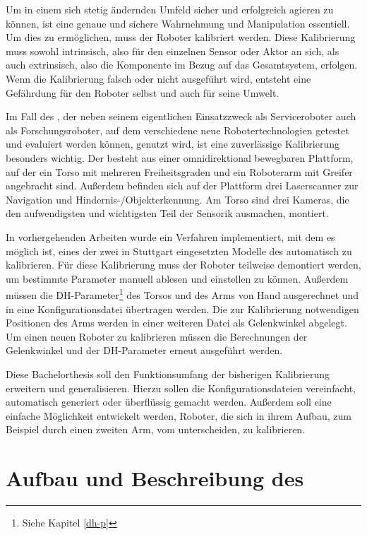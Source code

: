 Um in einem sich stetig ändernden Umfeld sicher und erfolgreich agieren zu 
können, ist eine genaue und sichere Wahrnehmung und Manipulation essentiell. 
Um dies zu ermöglichen, muss der Roboter kalibriert werden. Diese Kalibrierung 
muss sowohl intrinsisch, also für den einzelnen Sensor oder Aktor an sich, als 
auch extrinsisch, also die Komponente im Bezug auf das Gesamtsystem, erfolgen. 
Wenn die Kalibrierung falsch oder nicht ausgeführt wird, entsteht
eine Gefährdung für den Roboter selbst und auch für seine Umwelt. 

Im Fall des \cob, der neben seinem eigentlichen Einsatzzweck als Serviceroboter auch
als Forschungsroboter, auf dem verschiedene neue Robotertechnologien getestet 
und evaluiert werden können, genutzt wird, ist eine zuverlässige Kalibrierung 
besonders wichtig. Der \cob besteht aus einer omnidirektional bewegbaren 
Plattform, auf der ein Torso mit mehreren Freiheitsgraden und ein Roboterarm 
mit Greifer angebracht sind. Außerdem befinden sich auf der Plattform drei 
Laserscanner zur Navigation und Hindernis-/Objekterkennung. Am Torso sind drei 
Kameras, die den aufwendigsten und wichtigsten Teil der Sensorik ausmachen, 
montiert.

In vorhergehenden Arbeiten wurde ein Verfahren implementiert, mit dem es möglich 
ist, eines der zwei in Stuttgart eingesetzten Modelle des \cob automatisch zu 
kalibrieren. Für diese Kalibrierung muss der Roboter teilweise 
demontiert werden, um bestimmte Parameter manuell ablesen und einstellen zu 
können. Außerdem müssen die \ac{DH-Parameter}\footnote{Siehe Kapitel \ref{dh-p}} des Torsos und des Arms von Hand 
ausgerechnet und in eine Konfigurationsdatei übertragen werden. Die zur 
Kalibrierung notwendigen Positionen des Arms werden in einer weiteren Datei als 
Gelenkwinkel abgelegt. Um einen neuen Roboter zu kalibrieren müssen die 
Berechnungen der Gelenkwinkel und der \ac{DH-Parameter} erneut ausgeführt werden. 

Diese Bachelorthesis soll den Funktionsumfang der bisherigen Kalibrierung 
erweitern und generalisieren. Hierzu sollen die Konfigurationsdateien vereinfacht, 
automatisch generiert oder überflüssig gemacht werden. Außerdem soll eine 
einfache Möglichkeit entwickelt werden, Roboter, die sich in ihrem Aufbau, zum Beispiel durch 
einen zweiten Arm, vom \cob unterscheiden, zu kalibrieren.



\section{Aufbau und Beschreibung des \cob}

